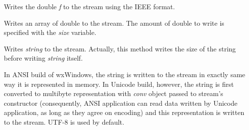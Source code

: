 

Writes the double {\it f} to the stream using the IEEE format.


Writes an array of double to the stream. The amount of double to write is
specified with the {\it size} variable.

\label{wxdataoutputstreamwritestring}


Writes {\it string} to the stream. Actually, this method writes the size of
the string before writing {\it string} itself.

In ANSI build of wxWindows, the string is written to the stream in exactly
same way it is represented in memory. In Unicode build, however, the string
is first converted to multibyte representation with {\it conv} object passed
to stream's constructor (consequently, ANSI application can read data 
written by Unicode application, as long as they agree on encoding) and this
representation is written to the stream. UTF-8 is used by default.


